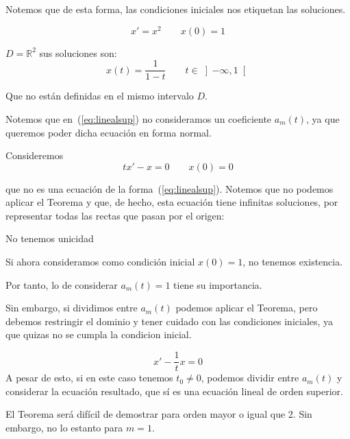 Notemos que de esta forma, las condiciones iniciales nos etiquetan las soluciones.

\begin{ejemplo}
    \begin{equation*}
        x' = x^2 \qquad x(0) = 1
    \end{equation*}

    $D=\mathbb{R}^2$ sus soluciones son:
    \begin{equation*}
        x(t) = \dfrac{1}{1-t} \qquad t\in \left]-\infty,1\right[
    \end{equation*}

    Que no están definidas en el mismo intervalo $D$.
\end{ejemplo}

Notemos que en~(\ref{eq:linealsup}) no consideramos un coeficiente $a_m(t)$, ya que queremos poder dicha ecuación en forma normal.

\begin{ejemplo}
    Consideremos
    \begin{equation*}
        tx'-x = 0 \qquad x(0) = 0
    \end{equation*}

    que no es una ecuación de la forma~(\ref{eq:linealsup}). Notemos que no podemos aplicar el Teorema y que, de hecho, esta ecuación tiene infinitas soluciones, por representar todas las rectas que pasan por el origen:

    No tenemos unicidad

    Si ahora consideramos como condición inicial $x(0)=1$, no tenemos existencia.
\end{ejemplo}

Por tanto, lo de considerar $a_m(t)=1$ tiene su importancia.

Sin embargo, si dividimos entre $a_m(t)$ podemos aplicar el Teorema, pero debemos restringir el dominio y tener cuidado con las condiciones iniciales, ya que quizas no se cumpla la condicion inicial.

\begin{equation*}
    x' - \dfrac{1}{t}x = 0 
\end{equation*}
A pesar de esto, si en este caso tenemos $t_0\neq 0$, podemos dividir entre $a_m(t)$ y considerar la ecuación resultado, que sí es una ecuación lineal de orden superior.

El Teorema será difícil de demostrar para orden mayor o igual que 2. Sin embargo, no lo estanto para $m=1$.

